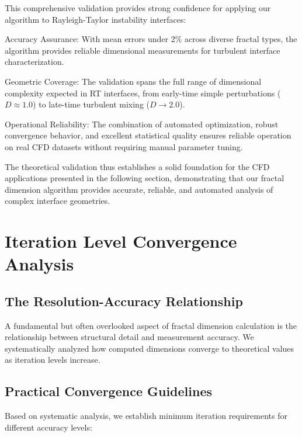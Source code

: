 \documentclass[preprint,12pt]{elsarticle}
\def\textbf#1{#1}%
\begin{document}
This comprehensive validation provides strong confidence for applying our algorithm to Rayleigh-Taylor instability interfaces:

\textbf{Accuracy Assurance}: With mean errors under 2\% across diverse fractal types, the algorithm provides reliable dimensional measurements for turbulent interface characterization.

\textbf{Geometric Coverage}: The validation spans the full range of dimensional complexity expected in RT interfaces, from early-time simple perturbations ($D \approx 1.0$) to late-time turbulent mixing ($D \to 2.0$).

\textbf{Operational Reliability}: The combination of automated optimization, robust convergence behavior, and excellent statistical quality ensures reliable operation on real CFD datasets without requiring manual parameter tuning.

The theoretical validation thus establishes a solid foundation for the CFD applications presented in the following section, demonstrating that our fractal dimension algorithm provides accurate, reliable, and automated analysis of complex interface geometries.


\section{Iteration Level Convergence Analysis}
\label{sec:iteration}

\subsection{The Resolution-Accuracy Relationship}

A fundamental but often overlooked aspect of fractal dimension calculation is the relationship between structural detail and measurement accuracy. We systematically analyzed how computed dimensions converge to theoretical values as iteration levels increase.

\subsection{Practical Convergence Guidelines}

Based on systematic analysis, we establish minimum iteration requirements for different accuracy levels:
\end{document}

